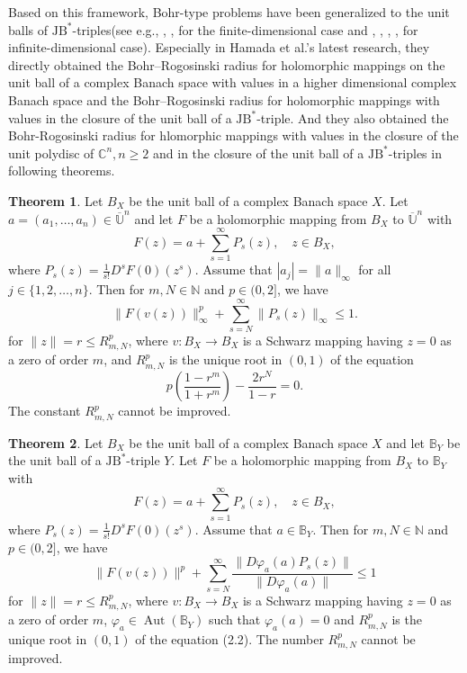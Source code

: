 \documentclass{birkjour}
\theoremstyle{plain}
\theoremstyle{definition}
\theoremstyle{definition}
\newtheorem{theorem}{Theorem}
\begin{document}
Based on this framework, Bohr-type problems have been generalized to the unit balls of $\text{JB}^*$-triples(see e.g.\cite{ref15}, \cite{ref21}, \cite{ref24}, \cite{ref25} for the finite-dimensional case and \cite{ref15}, \cite{ref22}, \cite{ref23}, \cite{ref25}, \cite{ref26} for infinite-dimensional case). Especially in Hamada et al.'s latest research\cite{ref25}, they directly obtained the Bohr–Rogosinski radius for holomorphic mappings on the unit ball of a complex Banach space with values in a higher dimensional complex Banach space and the Bohr–Rogosinski radius for holomorphic mappings with values in the closure of the unit ball of a $\text{JB}^*$-triple. And they also obtained the Bohr-Rogosinski radius for hlomorphic mappings with values in the closure of the unit polydisc of ${\mathbb{C}}^n, n \ge 2$ and in the closure of the unit ball of a $\text{JB}^*$-triples in following theorems.
\begin{theorem}\cite{ref25}
	Let $B_X$ be the unit ball of a complex Banach space $X$. Let $a=(a_1,\dots,a_n)\in\overline{\mathbb{U}}^n$ and let $F$ be a holomorphic mapping from $B_X$ to $\overline{\mathbb{U}}^n$ with
	\begin{equation*}
		F(z)=a+\sum_{s=1}^{\infty}P_s(z),\quad z\in B_X,
	\end{equation*}
	where $P_s(z)=\frac{1}{s!}D^sF(0)(z^s)$. Assume that $|a_j|=\|a\|_{\infty}$ for all $j\in\{1,2,\dots,n\}$. Then for $m,N\in\mathbb{N}$ and $p\in(0,2]$, we have
	\begin{equation*}
		\|F(v(z))\|_{\infty}^p+\sum_{s=N}^{\infty}\|P_s(z)\|_{\infty}\leq 1.
	\end{equation*}
	for $\|z\|=r\leq R_{m,N}^p$, where $v:B_X\to B_X$ is a Schwarz mapping having $z=0$ as a zero of order $m$, and $R_{m,N}^p$ is the unique root in $(0,1)$ of the equation
	\begin{equation*}
		p\left(\frac{1-r^m}{1+r^m}\right)-\frac{2r^N}{1-r}=0.
	\end{equation*}
	The constant $R_{m,N}^p$ cannot be improved.
\end{theorem}
\begin{theorem}\cite{ref25}
	Let $B_X$ be the unit ball of a complex Banach space $X$ and let $\mathbb{B}_Y$ be the unit ball of a $\text{JB}^*$-triple $Y$. Let $F$ be a holomorphic mapping from $B_X$ to $\mathbb{B}_Y$ with
	\[
	F(z) = a + \sum_{s=1}^{\infty} P_s(z),\quad z\in B_X,
	\]
	where $P_s(z) = \frac{1}{s!} D^s F(0)(z^s)$. Assume that $a\in \mathbb{B}_Y$. Then for $m, N\in \mathbb{N}$ and $p\in(0,2]$, we have
	\[
	\|F(v(z))\|^p + \sum_{s=N}^{\infty}\frac{\|D\varphi_a(a)P_s(z)\|}{\|D\varphi_a(a)\|} \le 1
	\]
	for $\|z\| = r \le R_{m,N}^p$, where $v\colon B_X\to B_X$ is a Schwarz mapping having $z=0$ as a zero of order $m$, $\varphi_a\in \operatorname{Aut}(\mathbb{B}_Y)$ such that $\varphi_a(a)=0$ and $R_{m,N}^p$ is the unique root in $(0,1)$ of the equation (2.2). The number $R_{m,N}^p$ cannot be improved.
\end{theorem}
\end{document}
